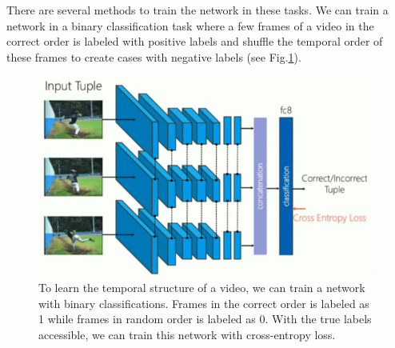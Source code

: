 There are several methods to train the network in these tasks.
We can train a network in a binary classification task where a few frames of a video in the correct order is labeled with positive labels and shuffle the temporal order of these frames to create cases with negative labels (see Fig.\ref{fig:shuffle-learn}). 


\begin{figure}[H]
  \includegraphics[width=\linewidth]{figs/shuffle-learn.png}
    \caption{To learn the temporal structure of a video, we can train a network with binary classifications. 
    Frames in the correct order is labeled as 1 while frames in random order is labeled as 0.
  With the true labels accessible, we can train this network with cross-entropy loss.}
  \label{fig:shuffle-learn}
\end{figure}

